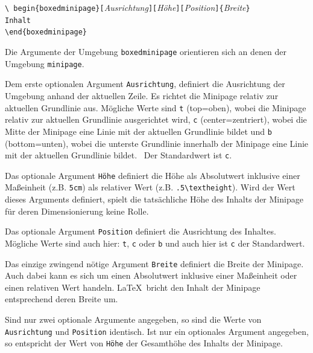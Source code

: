 \documentclass[a4paper,10pt,twoside]{scrbook}
\begin{document}
\begin{boxedminipage}{\textwidth}
\texttt{\textbackslash
begin\{boxedminipage\}[}\textsl{Ausrichtung}\texttt{][}\textsl{Höhe}\texttt{][}\textsl{Position}\texttt{]\{}\textsl{Breite}\texttt{\} \\
Inhalt \\
\textbackslash end\{boxedminipage\}}
\end{boxedminipage}


Die Argumente der Umgebung \verb!boxedminipage! orientieren sich an denen der Umgebung \verb!minipage!.

Dem erste optionalen Argument \verb!Ausrichtung!, definiert die Ausrichtung der Umgebung anhand der aktuellen Zeile. Es richtet die Minipage relativ zur aktuellen Grundlinie aus. Mögliche Werte sind \verb!t! (top=oben), wobei die Minipage relativ zur aktuellen Grundlinie ausgerichtet wird, \verb!c! (center=zentriert), wobei die Mitte der Minipage eine Linie mit der aktuellen Grundlinie bildet und \verb!b! (bottom=unten), wobei die unterste Grundlinie innerhalb der Minipage eine Linie mit der aktuellen Grundlinie bildet.~\cite{goLaTeX_minipage_Webpage} Der Standardwert ist \verb!c!.


Das optionale Argument \verb!Höhe! definiert die Höhe als Absolutwert inklusive einer Maßeinheit (z.B. \verb!5cm!) als relativer Wert (z.B. \verb!.5\textheight!). Wird der Wert dieses Arguments definiert, spielt die tatsächliche Höhe des Inhalts der Minipage für deren Dimensionierung keine Rolle. 

Das optionale Argument \verb!Position! definiert die Ausrichtung des Inhaltes. Mögliche Werte sind auch hier: \verb!t!, \verb!c! oder \verb!b! und auch hier ist \verb!c! der Standardwert.

Das einzige zwingend nötige Argument \verb!Breite! definiert die Breite der Minipage. Auch dabei kann es sich um einen Absolutwert inklusive einer Maßeinheit oder einen relativen Wert handeln. \LaTeX\ bricht den Inhalt der Minipage entsprechend deren Breite um.

Sind nur zwei optionale Argumente angegeben, so sind die Werte von \verb!Ausrichtung! und \verb!Position! identisch. 
Ist nur ein optionales Argument angegeben, so entspricht der Wert von \verb!Höhe! der Gesamthöhe des Inhalts der Minipage.
\end{document}
